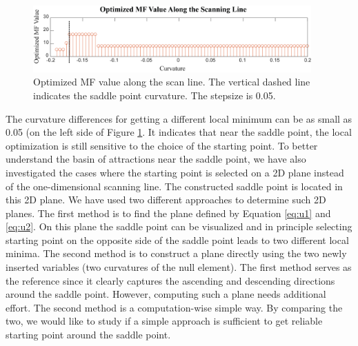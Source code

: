 \begin{figure}[h!]
    \centering
    \includegraphics[width=0.95\textwidth]{chapter-4/figures/Scanning_Line_plot.png}
    \caption{Optimized MF value along the scan line. The vertical dashed line indicates the saddle point curvature. The stepsize is 0.05.}
    \label{fig: scanning_line}
\end{figure}

The curvature differences for getting a different local minimum can be as small as 0.05 (on the left side of Figure \ref{fig: scanning_line}. It indicates that near the saddle point, the local optimization is still sensitive to the choice of the starting point. To better understand the basin of attractions near the saddle point, we have also investigated the cases where the starting point is selected on a 2D plane instead of the one-dimensional scanning line. The constructed saddle point is located in this 2D plane. We have used two different approaches to determine such 2D planes. The first method is to find the plane defined by Equation \ref{eq:u1} and \ref{eq:u2}. On this plane the saddle point can be visualized and in principle selecting starting point on the opposite side of the saddle point leads to two different local minima. The second method is to construct a plane directly using the two newly inserted variables (two curvatures of the null element). The first method serves as the reference since it clearly captures the ascending and descending directions around the saddle point. However, computing such a plane needs additional effort. The second method is a computation-wise simple way. By comparing the two, we would like to study if a simple approach is sufficient to get reliable starting point around the saddle point. 

